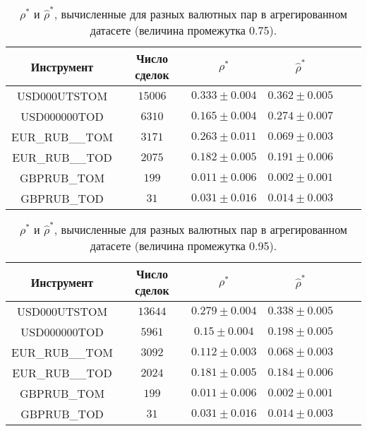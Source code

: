 \begin{table}[h!]
    \begin{center}
        \begin{tabular}{|c|c|c|c|c|c|}
            \hline
            Инструмент      & Число сделок & $\rho^*$ & $\hat \rho^*$            \\ \hline
            USD000UTSTOM    & $15006$      & $0.333 \pm 0.004$ & $0.362 \pm 0.005$ \\ \hline
            USD000000TOD    & $6310$       & $0.165 \pm 0.004$ & $0.274 \pm 0.007$ \\ \hline
            EUR\_RUB\_\_TOM & $3171$       & $0.263 \pm 0.011$ & $0.069 \pm 0.003$ \\ \hline
            EUR\_RUB\_\_TOD & $2075$       & $0.182 \pm 0.005$ & $0.191 \pm 0.006$ \\ \hline
            GBPRUB\_TOM     & $199$        & $0.011 \pm 0.006$ & $0.002 \pm 0.001$ \\ \hline
            GBPRUB\_TOD     & $31$         & $0.031 \pm 0.016$ & $0.014 \pm 0.003$ \\ \hline
        \end{tabular}
    \end{center}
    \caption{$\rho^*$ и $\hat \rho^*$, вычисленные для разных валютных пар в агрегированном датасете (величина промежутка 0.75).}
    \label{Aggreg1CU}
\end{table}

\begin{table}[h!]
    \begin{center}
        \begin{tabular}{|c|c|c|c|c|c|}
            \hline
            Инструмент      & Число сделок & $\rho^*$ & $\hat \rho^*$            \\ \hline
            USD000UTSTOM    & $13644$ & $0.279 \pm 0.004$ & $0.338 \pm 0.005$ \\ \hline
            USD000000TOD    & $5961$  & $0.15 \pm 0.004$  & $0.198 \pm 0.005$ \\ \hline
            EUR\_RUB\_\_TOM & $3092$  & $0.112 \pm 0.003$ & $0.068 \pm 0.003$ \\ \hline
            EUR\_RUB\_\_TOD & $2024$  & $0.181 \pm 0.005$ & $0.184 \pm 0.006$ \\ \hline
            GBPRUB\_TOM     & $199$   & $0.011 \pm 0.006$ & $0.002 \pm 0.001$ \\ \hline
            GBPRUB\_TOD     & $31$    & $0.031 \pm 0.016$ & $0.014 \pm 0.003$ \\ \hline
        \end{tabular}
    \end{center}
    \caption{$\rho^*$ и $\hat \rho^*$, вычисленные для разных валютных пар в агрегированном датасете (величина промежутка 0.95).}
    \label{Aggreg1CU}
\end{table}

